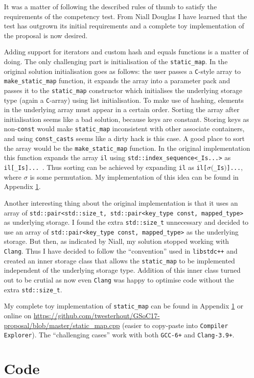 \documentclass[a4paper,12pt]{article}
\begin{document}
    It was a matter of following the described rules of thumb to satisfy the requirements of the competency test. From Niall Douglas I have learned that the test has outgrown its initial requirements and a complete toy implementation of the proposal is now desired.

    Adding support for iterators and custom hash and equals functions is a matter of doing. The only challenging part is initialisation of the \texttt{static\_map}. In the original solution initialisation goes as follows: the user passes a \texttt{C}-style array to \texttt{make\_static\_map} function, it expands the array into a parameter pack and passes it to the \texttt{static\_map} constructor which initialises the underlying storage type (again a \texttt{C}-array) using list initialisation. To make use of hashing, elements in the underlying array must appear in a certain order. Sorting the array after initialisation seems like a bad solution, because keys are constant. Storing keys as non-\texttt{const} would make \texttt{static\_map} inconsistent with other associate containers, and using \texttt{const\_casts} seems like a dirty hack is this case. A good place to sort the array would be the \texttt{make\_static\_map} function. In the original implementation this function expands the array \texttt{il} using \texttt{std::index\_sequence<\_Is...>} as \texttt{il[\_Is]...}\ . Thus sorting can be achieved by expanding \texttt{il} as \texttt{il[}$\sigma($\texttt{\_Is}$)$\texttt{]...}, where $\sigma$ is some permutation. My implementation of this idea can be found in Appendix \ref{competency-code}.

    Another interesting thing about the original implementation is that it uses an array of \texttt{std::pair<std::size\_t, std::pair<key\_type const, mapped\_type>} as underlying storage. I found the extra \texttt{std::size\_t} unnecessary and decided to use an array of \texttt{std::pair<key\_type const, mapped\_type>} as the underlying storage. But then, as indicated by Niall, my solution stopped working with \texttt{Clang}. Thus I have decided to follow the ``convention'' used in \texttt{libstdc++} and created an inner storage class that allows the \texttt{static\_map} to be implemented independent of the underlying storage type. Addition of this inner class turned out to be crutial as now even \texttt{Clang} was happy to optimise code without the extra \texttt{std::size\_t}.

    My complete toy implementation of \texttt{static\_map} can be found in Appendix \ref{competency-code} or online on \url{https://github.com/twesterhout/GSoC17-proposal/blob/master/static_map.cpp} (easier to copy-paste into \texttt{Compiler Explorer}). The ``challenging cases'' work with both \texttt{GCC-6+} and \texttt{Clang-3.9+}.

\newpage
\appendix
\section{Code} \label{competency-code}
    \begin{spacing}{0.8}
    
    \end{spacing}
\end{document}

